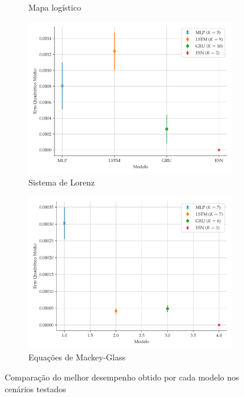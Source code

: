 \documentclass[9pt, technote]{article}
\begin{document}
\begin{figure}[H]
\begin{subfigure}[t]{0.24\textwidth}
         \caption{Mapa logístico}
     \end{subfigure}
     \centering
     \begin{subfigure}[t]{0.24\textwidth}
         \includegraphics[scale=0.24]{comparacao-k-lorenz.pdf}
         \caption{Sistema de Lorenz}
     \end{subfigure}
     \centering
     \begin{subfigure}[t]{0.24\textwidth} 
         \includegraphics[scale=0.24]{comparacao-mackeyglass.pdf}
         \caption{Equações de Mackey-Glass}
     \end{subfigure}  
     \centering   
     \caption{Comparação do melhor desempenho obtido por cada modelo nos cenários testados}
     \label{fig:model-comparison}
\end{figure}
\end{document}
